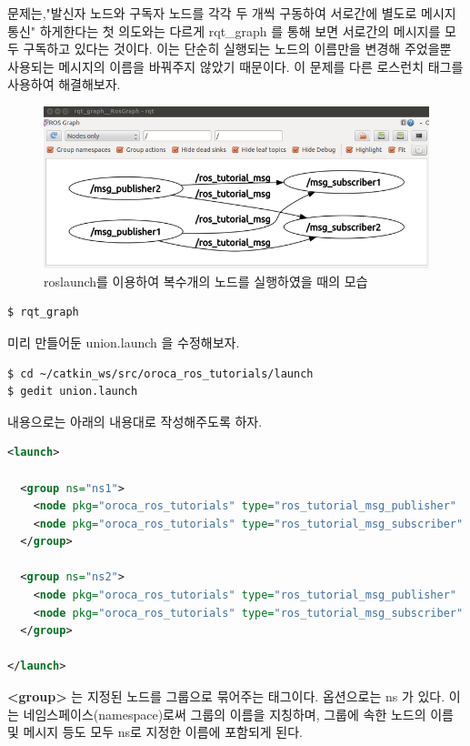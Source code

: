 문제는,"발신자 노드와 구독자 노드를 각각 두 개씩 구동하여 서로간에 별도로 메시지 통신" 하게한다는 첫 의도와는 다르게 rqt\_graph 를 통해 보면 서로간의 메시지를 모두 구독하고 있다는 것이다. 이는 단순히 실행되는 노드의 이름만을 변경해 주었을뿐 사용되는 메시지의 이름을 바꿔주지 않았기 때문이다. 이 문제를 다른 로스런치 태그를 사용하여 해결해보자.

\begin{figure}[h]
\centering\includegraphics[width=0.9\columnwidth]{pictures/chapter7/rqt_graph_oroca_ros_tutorials_union1.png}
\caption{roslaunch를 이용하여 복수개의 노드를 실행하였을 때의 모습}
\end{figure}

\begin{lstlisting}[language=ROS]
$ rqt_graph
\end{lstlisting}

미리 만들어둔 union.launch 을 수정해보자.

\begin{lstlisting}[language=ROS]
$ cd ~/catkin_ws/src/oroca_ros_tutorials/launch
$ gedit union.launch
\end{lstlisting}

내용으로는 아래의 내용대로 작성해주도록 하자.

\begin{lstlisting}[language=XML]
<launch>

  <group ns="ns1">
    <node pkg="oroca_ros_tutorials" type="ros_tutorial_msg_publisher"   name="msg_publisher"/>
    <node pkg="oroca_ros_tutorials" type="ros_tutorial_msg_subscriber"  name="msg_subscriber"/>
  </group>

  <group ns="ns2">
    <node pkg="oroca_ros_tutorials" type="ros_tutorial_msg_publisher"  name="msg_publisher"/>
    <node pkg="oroca_ros_tutorials" type="ros_tutorial_msg_subscriber"  name="msg_subscriber"/>
  </group>

</launch>
\end{lstlisting}

\textbf{\textless group\textgreater} 는 지정된 노드를 그룹으로 묶어주는 태그이다. 옵션으로는 ns 가 있다. 이는 네임스페이스(namespace)로써 그룹의 이름을 지칭하며, 그룹에 속한 노드의 이름 및 메시지 등도 모두 ns로 지정한 이름에 포함되게 된다.


